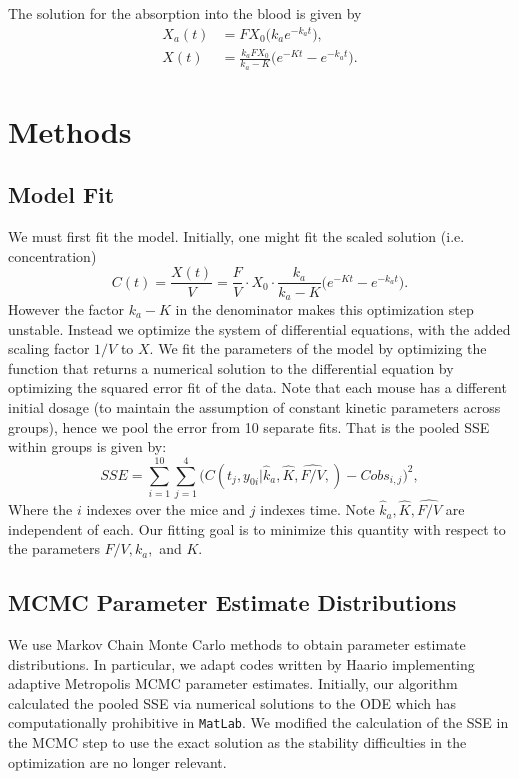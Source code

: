 \documentclass{article}
\begin{document}
The solution for the absorption into the blood is given by 
\begin{align*}
X_a(t) &= FX_0 \big( k_ae^{-k_at} \big),\\ 
X(t) &= \frac{k_a F X_0}{k_a - K}\big( e^{-Kt} - e^{-k_a t}\big).
\end{align*}

\section{Methods}

\subsection{Model Fit}
We must first fit the model. Initially, one might fit the scaled solution (i.e. concentration) 
$$C(t) = \frac{X(t)}{V} = \frac{F}{V} \cdot X_0 \cdot \frac{k_a}{k_a -K}\big( e^{-Kt} - e^{-k_a t}\big).$$
However the factor $k_a - K$ in the denominator makes this optimization step unstable.  Instead we optimize the system of differential equations, with the added scaling factor $1 / V$ to $X$.  We fit the parameters of the model by optimizing the function that returns a numerical solution to the differential equation  by optimizing the squared error fit of the data.  Note that each mouse has a different initial dosage (to maintain the assumption of constant kinetic parameters across groups), hence we pool the error from 10 separate fits.  That is the pooled SSE within groups is given by:
  $$
    SSE = \sum_{i=1}^{10} \sum_{j=1}^4 \big(C(t_j,y_{0i}|\hat k_a,\hat K,\widehat{F/V},) - Cobs_{i,j}\big)^2,
  $$
  Where the $i$ indexes over the mice and $j$ indexes time.  Note $\hat k_a,\hat K,\widehat{F/V}$ are independent of each.  Our fitting goal is to minimize this quantity with respect to the parameters $F/V,k_a,$ and $K$.  

\subsection{MCMC Parameter Estimate Distributions}  

We use Markov Chain Monte Carlo methods to obtain parameter estimate distributions.  In particular, we adapt codes written by Haario \cite{hario} implementing adaptive Metropolis MCMC parameter estimates.  Initially, our algorithm calculated the pooled SSE via numerical solutions to the ODE which has computationally prohibitive in \texttt{MatLab}.  We modified the calculation of the SSE in the MCMC step to use the exact solution as the stability difficulties in the optimization are no longer relevant. 
\end{document}
